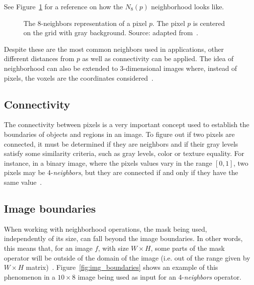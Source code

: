 See Figure~\ref{fig:n8-neighbors} for a reference on how the $N_8(p)$ neighborhood looks like.

\begin{figure}[ht]
    \centering

    \caption[The 8-\textit{neighbors} representation of a pixel $p$]{The 8-neighbors representation of a pixel $p$. The pixel $p$ is centered on the grid with gray background. Source: adapted from~\citet{pedrini:08}.}
    \label{fig:n8-neighbors}
\end{figure}

Despite these are the most common neighbors used in applications, other different distances from $p$ as well as connectivity can be applied. The idea of neighborhood can also be extended to 3-dimensional images where, instead of pixels, the voxels are the coordinates considered~\citep{pedrini:08}.


\subsection{Connectivity}
\label{sec:connectivity}
The connectivity between pixels is a very important concept used to establish the boundaries of objects and regions in an image. To figure out if two pixels are connected, it must be determined if they are neighbors and if their gray levels satisfy some similarity criteria, such as gray levels, color or texture equality. For instance, in a binary image, where the pixels values vary in the range $[0, 1]$, two pixels may be 4-\textit{neighbors}, but they are connected if and only if they have the same value~\citep{gonzalez:02}.


\subsection{Image boundaries}
\label{sec:image_boundaries}

When working with neighborhood operations, the mask being used, independently of its size, can fall beyond the image boundaries. In other words, this means that, for an image $f$, with size $W \times H$, some parts of the mask operator will be outside of the domain of the image (i.e. out of the range given by $W \times H$ matrix)~\citep{pedrini:08}. Figure~\ref{fig:img_boundaries} shows an example of this phenomenon in a $10 \times 8$ image being used as input for an 4-\textit{neighbors} operator.

